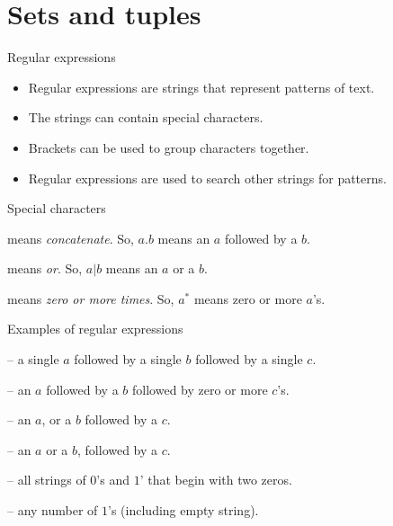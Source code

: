 \documentclass{beamer}
\begin{document}
\section{Sets and tuples}

\begin{frame}{Regular expressions}
  

  \begin{itemize}
    \item Regular expressions are strings that represent patterns of text.
    \item The strings can contain special characters.
    \item Brackets can be used to group characters together.
    \item Regular expressions are used to search other strings for patterns.
  \end{itemize}
  \begin{alertblock}{Special characters}
    \begin{description}[abbb]
      \item[$.$] means \emph{concatenate}. So, $a.b$ means an $a$ followed by a $b$.
      \item[$|$] means \emph{or}. So, $a|b$ means an $a$ or a $b$.
      \item[$*$] means \emph{zero or more times}. So, $a^*$ means zero or more $a$'s.
    \end{description}
  \end{alertblock}
\end{frame}

\begin{frame}{Examples of regular expressions}
  \begin{description}[aaaaaaaa]
    \setlength\itemsep{5mm}
    \item[$a.b.c$] -- a single $a$ followed by a single $b$ followed by a single $c$. 
    \item[$a.b.c^*$] -- an $a$ followed by a $b$ followed by zero or more $c$'s.
    \item[$a|b.c$] -- an $a$, or a $b$ followed by a $c$.
    \item[$(a|b).c$] -- an $a$ or a $b$, followed by a $c$.
    \item[$0.0.(0|1)^*$] -- all strings of $0$'s and $1$' that begin with two zeros.
    \item[$1^*$] -- any number of $1$'s (including empty string).
  \end{description}
\end{frame}
\end{document}
